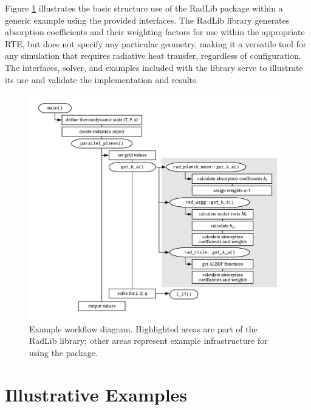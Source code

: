 \documentclass[preprint,12pt, a4paper]{elsarticle}
\begin{document}
Figure \ref{fig:flowchart} illustrates the basic structure use of the RadLib package within a generic example using the provided interfaces. The RadLib library generates absorption coefficients and their weighting factors for use within the appropriate RTE, but does not specify any particular geometry, making it a versatile tool for any simulation that requires radiative heat transfer, regardless of configuration. The interfaces, solver, and examples included with the library serve to illustrate its use and validate the implementation and results. 
%
\begin{figure}
	\begin{center}
		\includegraphics[width=\textwidth]{../figures/radlib_structure.pdf}
	\end{center}
	\caption{Example workflow diagram. Highlighted areas are part of the RadLib library; other areas represent example infrastructure for using the package.}
\label{fig:flowchart}
\end{figure}
%


\section{Illustrative Examples} \label{s:Examples}
\end{document}
